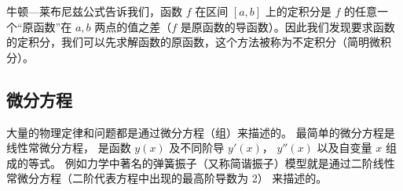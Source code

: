 牛顿—莱布尼兹公式告诉我们，函数 $f$ 在区间 $[a, b]$ 上的定积分是 $f$ 的任意一个“原函数”在 $a, b$ 两点的值之差（$f$ 是原函数的导函数）。因此我们发现要求函数的定积分，我们可以先求解函数的原函数，这个方法被称为不定积分（简明微积分）。

\subsection{微分方程}
大量的物理定律和问题都是通过微分方程（组）来描述的。 最简单的微分方程是线性常微分方程，%
是函数 $y(x)$ 及不同阶导 $y'(x)$， $y''(x)$ 以及自变量 $x$ 组成的等式。 例如力学中著名的弹簧振子（又称简谐振子）模型就是通过二阶线性常微分方程（二阶代表方程中出现的最高阶导数为 2） 来描述的。



